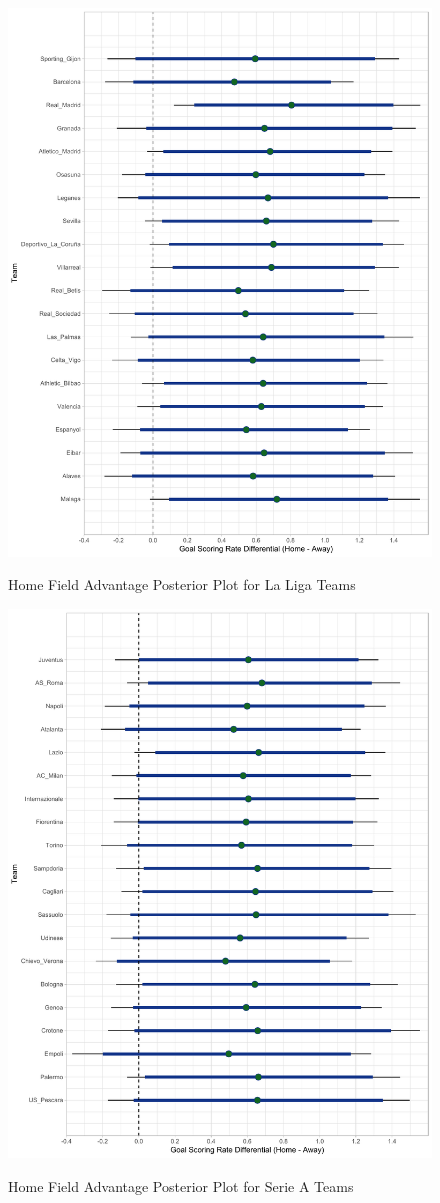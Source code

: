 \documentclass[USenglish]{article}
\begin{document}
\begin{figure}
\caption{Home Field Advantage Posterior Plot for La Liga Teams}
{\includegraphics[width=0.90\linewidth]{HFA_La_Liga11.pdf}}
\label{fig32}
\end{figure}


\begin{figure}
\caption{Home Field Advantage Posterior Plot for Serie A Teams}
{\includegraphics[width=0.90\linewidth]{HFA_Serie_A11.pdf}}
\label{fig4}
\end{figure}
\end{document}
